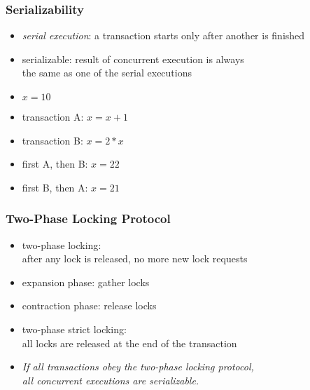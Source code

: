 \documentclass[dvipsnames]{beamer}
\theoremstyle{plain}
\begin{document}
\begin{frame}
  \frametitle{Serializability}

  \begin{itemize}
    \item \emph{serial execution}:
      a transaction starts only after another is finished

    \pause
    \item \alert{serializable}: result of concurrent execution is always\\
      the same as one of the serial executions
  \end{itemize}

  \pause
  \begin{example}
    \begin{itemize}
      \item $x=10$
      \item transaction A: $x=x+1$
      \item transaction B: $x=2*x$

      \pause
      \medskip
      \item first A, then B: $x=22$
      \item first B, then A: $x=21$
    \end{itemize}
  \end{example}
\end{frame}

\begin{frame}
  \frametitle{Two-Phase Locking Protocol}

  \begin{itemize}
    \item \alert{two-phase locking}:\\
      after any lock is released, no more new lock requests
    \item expansion phase: gather locks
    \item contraction phase: release locks

    \medskip
    \item \alert{two-phase strict locking}:\\
      all locks are released at the end of the transaction

    \pause
    \medskip
    \item \emph{If all transactions obey the two-phase locking protocol,\\
      all concurrent executions are serializable.}
  \end{itemize}
\end{frame}
\end{document}
